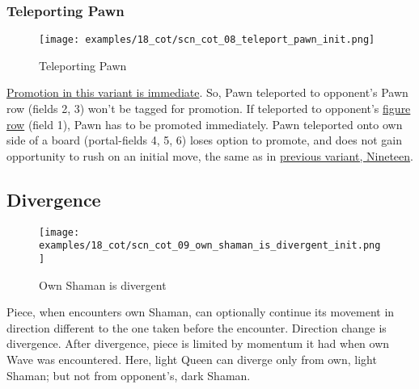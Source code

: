 \subsubsection*{Teleporting Pawn}
\label{sec:Conquest of Tlalocan/Shaman/Movement/Teleporting Pawn}

\vspace*{-1.4\baselineskip}
\noindent
\begin{figure}[!h]
\texttt{[image: examples/18\_cot/scn\_cot\_08\_teleport\_pawn\_init.png]}
\caption{Teleporting Pawn}
\label{fig:scn_cot_08_teleport_pawn_init}
\end{figure}

\hyperref[sec:Conquest of Tlalocan/Promotion]{Promotion in this variant is immediate}.
So, Pawn teleported to opponent's Pawn row (fields 2, 3) won't be tagged for promotion.
If teleported to opponent's \hyperref[sec:Terms/Figure row]{figure row} (field 1),
Pawn has to be promoted immediately.
Pawn teleported onto own side of a board (portal-fields 4, 5, 6) loses option to
promote, and does not gain opportunity to rush on an initial move, the same as in
\hyperref[fig:scn_n_12_teleport_pawns_step_1]{previous variant, Nineteen}.

\clearpage %

\subsection*{Divergence}
\label{sec:Conquest of Tlalocan/Shaman/Divergence}

\vspace*{-1.4\baselineskip}
\noindent
\begin{figure}[!h]
\texttt{[image: examples/18\_cot/scn\_cot\_09\_own\_shaman\_is\_divergent\_init.png]}
\vspace*{-1.3\baselineskip}
\caption{Own Shaman is divergent}
\label{fig:scn_cot_09_own_shaman_is_divergent_init}
\end{figure}

\vspace*{-0.5\baselineskip}
Piece, when encounters own Shaman, can optionally continue its movement in direction
different to the one taken before the encounter. Direction change is divergence. After
divergence, piece is limited by momentum it had when own Wave was encountered. \newline
Here, light Queen can diverge only from own, light Shaman; but not from opponent's,
dark Shaman.

